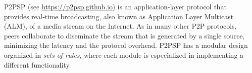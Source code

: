 P2PSP (see \url{https://p2psp.github.io}) is an application-layer
protocol that provides real-time broadcasting, also known as
Application Layer Multicast (ALM), of a media stream on the
Internet. As in many other P2P protocols, peers collaborate to
diseminate the stream that is generated by a single source, minimizing
the latency and the protocol overhead. P2PSP has a modular design
organized in \emph{sets of rules}, where each module is especialized
in implementing a different functionality.
